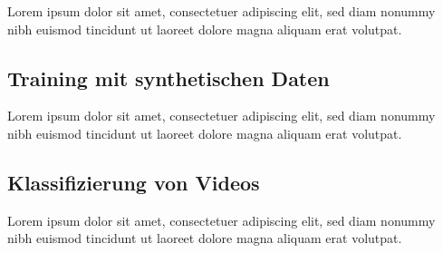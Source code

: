 Lorem ipsum dolor sit amet, consectetuer adipiscing elit, sed diam nonummy nibh euismod tincidunt ut laoreet dolore magna aliquam erat volutpat. 


\subsection{Training mit synthetischen Daten}
\label{grundlagen_nn_synthetisch}

Lorem ipsum dolor sit amet, consectetuer adipiscing elit, sed diam nonummy nibh euismod tincidunt ut laoreet dolore magna aliquam erat volutpat. 


\subsection{Klassifizierung von Videos}
\label{grundlagen_nn_video}

Lorem ipsum dolor sit amet, consectetuer adipiscing elit, sed diam nonummy nibh euismod tincidunt ut laoreet dolore magna aliquam erat volutpat. 


